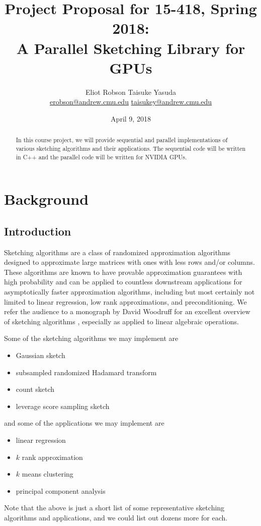 \documentclass[12pt]{article}
\begin{document}
\title{
    \normalsize Project Proposal for 15-418, Spring 2018: \\
    \LARGE A Parallel Sketching Library for GPUs
}
\author{Eliot Robson \qquad Taisuke Yasuda\\ \small
\href{mailto:erobson@andrew.cmu.edu}{erobson@andrew.cmu.edu} \quad \href{mailto:taisukey@andrew.cmu.edu}{taisukey@andrew.cmu.edu}}
\date{April 9, 2018}

\maketitle

\begin{abstract}
	In this course project, we will provide sequential and parallel implementations of various sketching algorithms and their applications. The sequential code will be written in C++ and the parallel code will be written for NVIDIA GPUs. 
\end{abstract}

\section{Background}

\subsection{Introduction}
Sketching algorithms are a class of randomized approximation algorithms designed to approximate large matrices with ones with less rows and/or columns. These algorithms are known to have provable approximation guarantees with high probability and can be applied to countless downstream applications for asymptotically faster approximation algorithms, including but most certainly not limited to linear regression, low rank approximations, and preconditioning. We refer the audience to a monograph by David Woodruff for an excellent overview of sketching algorithms \cite{woodruff2014sketching}, especially as applied to linear algebraic operations.

Some of the sketching algorithms we may implement are
\begin{itemize}
	\item Gaussian sketch
	\item subsampled randomized Hadamard transform
	\item count sketch
	\item leverage score sampling sketch
\end{itemize}
and some of the applications we may implement are
\begin{itemize}
	\item linear regression
	\item $k$ rank approximation
	\item $k$ means clustering
	\item principal component analysis
\end{itemize}
Note that the above is just a short list of some representative sketching algorithms and applications, and we could list out dozens more for each.
\end{document}

